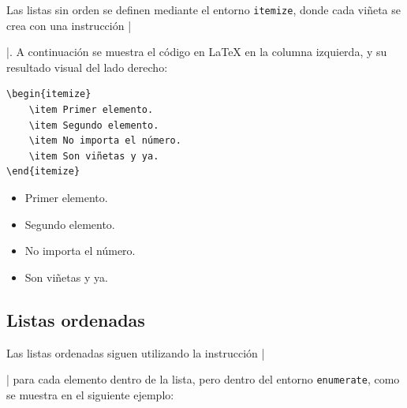 Las listas sin orden se definen mediante el entorno \texttt{itemize}, donde cada viñeta se crea con una instrucción |\item|. A continuación se muestra el código en \LaTeX{} en la columna izquierda, y su resultado visual del lado derecho:

\lstruleb\vspace{-5mm}
\begin{multicols}{2}
\begin{lstlisting}[style=latex,frame={}]
\begin{itemize}
	\item Primer elemento.
	\item Segundo elemento.
	\item No importa el número.
	\item Son viñetas y ya.
\end{itemize}
\end{lstlisting}

\columnbreak
\begin{itemize}[nosep]
	\item Primer elemento.
	\item Segundo elemento.
	\item No importa el número.
	\item Son viñetas y ya.
\end{itemize}
\end{multicols}
\vspace{-7mm}\lstruleb


\subsection{Listas ordenadas}
\label{sub:listas_ordenadas}



Las listas ordenadas siguen utilizando la instrucción |\item| para cada elemento dentro de la lista, pero dentro del entorno \texttt{enumerate}, como se muestra en el siguiente ejemplo:

